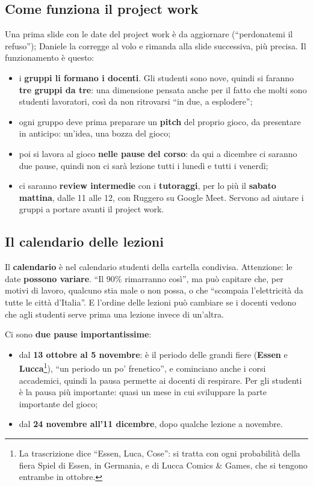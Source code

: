 \subsection{Come funziona il project work}

Una prima slide con le date del project work è da aggiornare (``perdonatemi il
refuso''); Daniele la corregge al volo e rimanda alla slide successiva, più
precisa. Il funzionamento è questo:
\begin{itemize}
  \item i \textbf{gruppi li formano i docenti}. Gli studenti sono nove, quindi si
        faranno \textbf{tre gruppi da tre}: una dimensione pensata anche per il
        fatto che molti sono studenti lavoratori, così da non ritrovarsi ``in due,
        a esplodere'';
  \item ogni gruppo deve prima preparare un \textbf{pitch} del proprio gioco, da
        presentare in anticipo: un'idea, una bozza del gioco;
  \item poi si lavora al gioco \textbf{nelle pause del corso}: da qui a dicembre
        ci saranno due pause, quindi non ci sarà lezione tutti i lunedì e tutti i
        venerdì;
  \item ci saranno \textbf{review intermedie} con i \textbf{tutoraggi}, per lo più
        il \textbf{sabato mattina}, dalle 11 alle 12, con Ruggero su Google Meet.
        Servono ad aiutare i gruppi a portare avanti il project work.
\end{itemize}

\subsection{Il calendario delle lezioni}

Il \textbf{calendario} è nel calendario studenti della cartella condivisa.
Attenzione: le date \textbf{possono variare}. ``Il 90\% rimarranno così'', ma
può capitare che, per motivi di lavoro, qualcuno stia male o non possa, o che
``scompaia l'elettricità da tutte le città d'Italia''. E l'ordine delle lezioni
può cambiare se i docenti vedono che agli studenti serve prima una lezione
invece di un'altra.

Ci sono \textbf{due pause importantissime}:
\begin{itemize}
  \item dal \textbf{13 ottobre al 5 novembre}: è il periodo delle grandi fiere
        (\textbf{Essen} e \textbf{Lucca}\footnote{La trascrizione dice ``Essen,
        Luca, Cose'': si tratta con ogni probabilità della fiera Spiel di Essen,
        in Germania, e di Lucca Comics \& Games, che si tengono entrambe in
        ottobre.}), ``un periodo un po' frenetico'', e cominciano anche i corsi
        accademici, quindi la pausa permette ai docenti di respirare. Per gli
        studenti è la pausa più importante: quasi un mese in cui sviluppare la
        parte importante del gioco;
  \item dal \textbf{24 novembre all'11 dicembre}, dopo qualche lezione a novembre.
\end{itemize}

